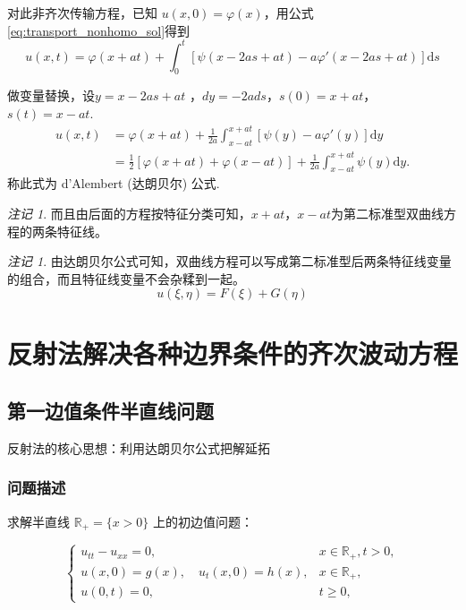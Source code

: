 \documentclass[a4paper, 12pt, oneside]{article} %
\numberwithin{subsection}{section}
\numberwithin{subsubsection}{subsection}
\theoremstyle{plain}
\theoremstyle{definition}
\theoremstyle{remark}
\newtheorem{remark}[theorem]{注记}
\begin{document}
		对此非齐次传输方程，已知 \(u(x, 0) = \varphi(x)\)，用公式\eqref{eq:transport_nonhomo_sol}得到
		\begin{equation}
			u(x, t) = \varphi(x + a t) + \int_0^t \left[ \psi(x - 2 a s + a t) - a \varphi'(x - 2 a s + a t) \right] \mathrm{d}s 
		\end{equation}
		
		
		做变量替换，设$y=x−2as+at$	，$dy=−2ads$，$s(0)=x+at$，$s(t)=x-at$.
		\begin{equation}\label{eq:dalembert_formula}
			\begin{aligned}
				u(x, t) &= \varphi(x + a t) + \frac{1}{2 a} \int_{x - a t}^{x + a t} \left[ \psi(y) - a \varphi'(y) \right] \mathrm{d}y \\
				&= \frac{1}{2} \left[ \varphi(x + a t) + \varphi(x - a t) \right] + \frac{1}{2 a} \int_{x - a t}^{x + a t} \psi(y) \mathrm{d}y.
			\end{aligned}
		\end{equation}
		称此式为 d'Alembert (达朗贝尔) 公式.
		
		\begin{remark}
			而且由后面的方程按特征分类可知，$x + a t$，$x - a t$为第二标准型双曲线方程的两条特征线。
		\end{remark}
		\begin{remark}
			由达朗贝尔公式可知，双曲线方程可以写成第二标准型后两条特征线变量的组合，而且特征线变量不会杂糅到一起。
			\[
			u(\xi, \eta) = F(\xi) + G(\eta)
			\]
		\end{remark}
		
	
		
		\section{反射法解决各种边界条件的齐次波动方程}
		\subsection{第一边值条件半直线问题}
		反射法的核心思想：利用达朗贝尔公式把解延拓
		
		\subsubsection{问题描述}
		求解半直线 \(\mathbb{R}_+ = \{x > 0\}\) 上的初边值问题：
		
		\begin{equation}
			\begin{cases}
				u_{tt} - u_{xx} = 0, & x \in \mathbb{R}_+, t > 0, \\
				u(x, 0) = g(x), \quad u_t(x, 0) = h(x), & x \in \mathbb{R}_+, \\
				u(0, t) = 0, & t \geq 0,
			\end{cases}
		\end{equation}
		
\end{document}
